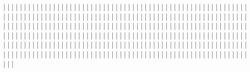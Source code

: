         |     |     |
        |     |     |
        |     |     |
        |     |     |
        |     |     |
        |     |     |
        |     |     |
        |     |     |
        |     |     |
        |     |     |
        |     |     |
        |     |     |
        |     |     |
        |     |     |
        |     |     |
        |     |     |
        |     |     |
        |     |     |
        |     |     |
        |     |     |
        |     |     |
        |     |     |
        |     |     |
        |     |     |
        |     |     |
        |     |     |
        |     |     |
        |     |     |
        |     |     |
        |     |     |
        |     |     |
        |     |     |
        |     |     |
        |     |     |
        |     |     |
        |     |     |
        |     |     |
        |     |     |
        |     |     |
        |     |     |
        |     |     |
        |     |     |
        |     |     |
        |     |     |
        |     |     |
        |     |     |
        |     |     |
        |     |     |
        |     |     |
        |     |     |
        |     |     |
        |     |     |
        |     |     |
        |     |     |
        |     |     |
        |     |     |
        |     |     |
        |     |     |
        |     |     |
        |     |     |
        |     |     |
        |     |     |
        |     |     |
        |     |     |
        |     |     |
        |     |     |
        |     |     |
        |     |     |
        |     |     |
        |     |     |
        |     |     |
        |     |     |
        |     |     |
        |     |     |
        |     |     |
        |     |     |
        |     |     |
        |     |     |
        |     |     |
        |     |     |
        |     |     |
        |     |     |
        |     |     |
        |     |     |
        |     |     |
        |     |     |
        |     |     |
        |     |     |
        |     |     |
        |     |     |
        |     |     |
        |     |     |
        |     |     |
        |     |     |
        |     |     |
        |     |     |
        |     |     |
        |     |     |
        |     |     |
        |     |     |
        |     |     |
        |     |     |
        |     |     |
        |     |     |
        |     |     |
        |     |     |
        |     |     |
        |     |     |
        |     |     |
        |     |     |
        |     |     |
        |     |     |
        |     |     |
        |     |     |
        |     |     |
        |     |     |
        |     |     |
        |     |     |
        |     |     |
